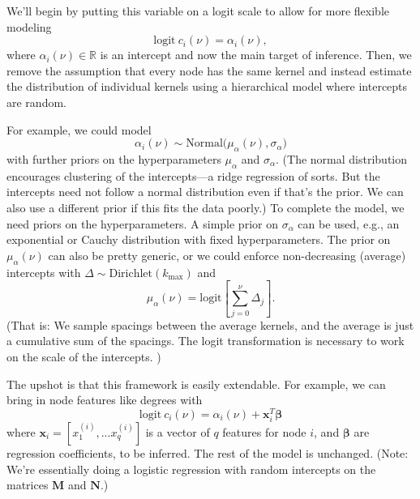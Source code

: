 \documentclass[10pt,aps,pre,twocolumn,nopacs,final,letterpaper,superscriptaddress,longbibliography]{revtex4-2}
\begin{document}
We'll begin by putting this variable on a logit scale to allow for more flexible modeling
\begin{equation}
    \mathrm{logit}\ c_i(\nu) = \alpha_i(\nu),
\end{equation}
where $\alpha_i(\nu)\in\mathbb{R}$ is an intercept and now the main target of inference.
Then, we remove the assumption that every node has the same kernel and instead estimate the distribution of individual kernels using a hierarchical model where intercepts are random.

For example, we could model
\begin{equation}
    \alpha_i(\nu)\sim\mathrm{Normal}\bigl(\mu_\alpha(\nu), \sigma_\alpha\bigr)
\end{equation}
with further priors on the hyperparameters $\mu_\alpha$ and $\sigma_\alpha$.
(The normal distribution encourages clustering of the intercepts---a ridge regression of sorts. But the intercepts need not follow a normal distribution even if that's the prior. We can also use a different prior if this fits the data poorly.)
To complete the model, we need priors on the hyperparameters.
A simple prior on $\sigma_\alpha$ can be used, e.g., an exponential or Cauchy distribution with fixed hyperparameters.
The prior on $\mu_\alpha(\nu)$ can also be pretty generic, or we could enforce non-decreasing (average) intercepts with $\Delta\sim\mathrm{Dirichlet}(k_{\max})$ and
\begin{equation}
    \mu_\alpha(\nu) = \mathrm{logit}\left[\sum_{j=0}^{\nu} \Delta_j\right].
\end{equation}
(That is: We sample spacings between the average kernels, and the average is just a cumulative sum of the spacings. The logit transformation is necessary to work on the scale of the intercepts. )


The upshot is that this framework is easily extendable.
For example, we can bring in node features like degrees with
\begin{equation}
    \mathrm{logit}\ c_i(\nu) = \alpha_i(\nu) + \bm{x}_i^T\bm{\beta}
\end{equation}
where $\bm{x}_i = [x^{(i)}_1, ... x^{(i)}_q]$ is a vector of $q$ features for node $i$, and $\bm{\beta}$ are regression coefficients, to be inferred.
The rest of the model is unchanged.
(Note: We're essentially doing a logistic regression with random intercepts on the matrices $\bm{M}$ and $\bm{N}$.)
\end{document}
